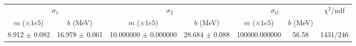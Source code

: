 \begin{tabular}{cc|cc|cc||c}
\multicolumn{2}{c|}{$\sigma_1$} & \multicolumn{2}{|c}{$\sigma_2$} & \multicolumn{2}{|c}{$\sigma_G$}  & \multirow{2}{*}{$\chi^2/$ndf}\\
$m$ ($\times1e5$) & $b$ (MeV) & $m$ ($\times1e5$) & $b$ (MeV) & $m$ ($\times1e5$) & $b$ (MeV) & \\
\hline
8.912 $\pm$ 0.082 & 16.978 $\pm$ 0.061 & 10.000000 $\pm$ 0.000000 & 28.684 $\pm$ 0.088 & 100000.000000 & 56.58 & 1431/246\\
\end{tabular}
